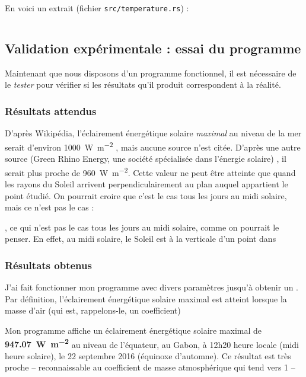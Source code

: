 \documentclass[12pt]{article}
\begin{document}
En voici un extrait (fichier \texttt{src/temperature.rs}) :

\inputminted[linenos]{rust}{rust-climate/src/temperature.rs}

\subsection{Validation expérimentale : essai du programme}

Maintenant que nous disposons d'un programme fonctionnel, il est nécessaire de le \emph{tester} pour vérifier si les résultats qu'il produit correspondent à la réalité.

\subsubsection{Résultats attendus}
D'après Wikipédia, l'éclairement énergétique solaire \emph{maximal} au niveau de la mer serait d'environ \SI{1000}{\watt\per\square\meter} \cite{earth_irradiance_wiki}, mais aucune source n'est citée.
D'après une autre source (Green Rhino Energy, une société spécialisée dans l'énergie solaire) \cite{green_rhino_irradiance}, il serait plus proche de \SI{960}{\watt\per\square\meter}.
Cette valeur ne peut être atteinte que quand les rayons du Soleil arrivent perpendiculairement au plan auquel appartient le point étudié. On pourrait croire que c'est le cas tous les jours au midi solaire, mais ce n'est pas le cas : 

, ce qui n'est pas le cas tous les jours au midi solaire, comme on pourrait le penser. En effet, au midi solaire, le Soleil est à la verticale d'un point dans 

\subsubsection{Résultats obtenus}
J'ai fait fonctionner mon programme avec divers paramètres jusqu'à obtenir un .
Par définition, l'éclairement énergétique solaire maximal est atteint lorsque la masse d'air (qui est, rappelons-le, un coefficient)

Mon programme affiche un éclairement énergétique solaire maximal de \textbf{\SI{947.07}{\watt\per\square\meter}} au niveau de l'équateur, au Gabon, à 12h20 heure locale (midi heure solaire), le 22 septembre 2016 (équinoxe d'automne). Ce résultat est très proche
-- reconnaissable au coefficient de masse atmosphérique qui tend vers 1 --

\begin{figure}[!ht]
  \centering
  \label{fig:maximum}
\end{figure}
\end{document}

